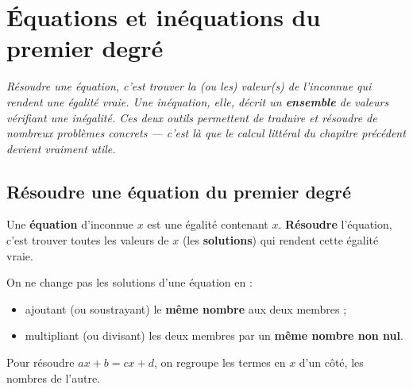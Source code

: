 \chapter{Équations et inéquations du premier degré}

\noindent\textit{Résoudre une équation, c'est trouver la (ou les) valeur(s) de l'inconnue qui
rendent une égalité vraie. Une inéquation, elle, décrit un \textbf{ensemble} de valeurs
vérifiant une inégalité. Ces deux outils permettent de traduire et résoudre de nombreux
problèmes concrets — c'est là que le calcul littéral du chapitre précédent devient vraiment
utile.}
\vspace{8pt}

\connecteBanner

\section{Résoudre une équation du premier degré}

\begin{definition}
Une \textbf{équation} d'inconnue $x$ est une égalité contenant $x$. \textbf{Résoudre}
l'équation, c'est trouver toutes les valeurs de $x$ (les \textbf{solutions}) qui rendent
cette égalité vraie.
\end{definition}

\begin{propriete}
On ne change pas les solutions d'une équation en :
\begin{itemize}
\item ajoutant (ou soustrayant) le \textbf{même nombre} aux deux membres ;
\item multipliant (ou divisant) les deux membres par un \textbf{même nombre non nul}.
\end{itemize}
Pour résoudre $ax+b=cx+d$, on regroupe les termes en $x$ d'un côté, les nombres de l'autre.
\end{propriete}

\begin{illus}
\end{illus}

